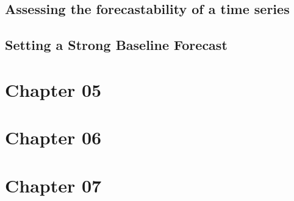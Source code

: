 \documentclass{article}
\begin{document}
\subsection{Assessing the forecastability of a time series}
\subsection{Setting a Strong Baseline Forecast}


\section{Chapter 05}

\section{Chapter 06}

\section{Chapter 07}
\end{document}
